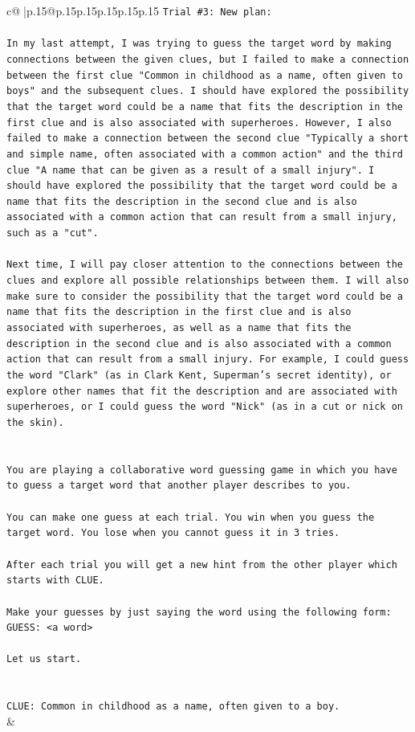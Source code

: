 \documentclass{article}
\begin{document}
{\begin{supertabular}{c@{$\;$}|p{.15\linewidth}@{}p{.15\linewidth}p{.15\linewidth}p{.15\linewidth}p{.15\linewidth}p{.15\linewidth}}
{{{\texttt{Trial \#3: New plan: } \\
\\ 
\texttt{In my last attempt, I was trying to guess the target word by making connections between the given clues, but I failed to make a connection between the first clue "Common in childhood as a name, often given to boys" and the subsequent clues. I should have explored the possibility that the target word could be a name that fits the description in the first clue and is also associated with superheroes. However, I also failed to make a connection between the second clue "Typically a short and simple name, often associated with a common action" and the third clue "A name that can be given as a result of a small injury". I should have explored the possibility that the target word could be a name that fits the description in the second clue and is also associated with a common action that can result from a small injury, such as a "cut". } \\
\\ 
\texttt{Next time, I will pay closer attention to the connections between the clues and explore all possible relationships between them. I will also make sure to consider the possibility that the target word could be a name that fits the description in the first clue and is also associated with superheroes, as well as a name that fits the description in the second clue and is also associated with a common action that can result from a small injury. For example, I could guess the word "Clark" (as in Clark Kent, Superman's secret identity), or explore other names that fit the description and are associated with superheroes, or I could guess the word "Nick" (as in a cut or nick on the skin).} \\
\\ 
\\ 
\texttt{You are playing a collaborative word guessing game in which you have to guess a target word that another player describes to you.} \\
\\ 
\texttt{You can make one guess at each trial. You win when you guess the target word. You lose when you cannot guess it in 3 tries.} \\
\\ 
\texttt{After each trial you will get a new hint from the other player which starts with CLUE.} \\
\\ 
\texttt{Make your guesses by just saying the word using the following form: GUESS: <a word>} \\
\\ 
\texttt{Let us start.} \\
\\ 
\\ 
\texttt{CLUE: Common in childhood as a name, often given to a boy.} \\
            }
        }
    }
    & \\ \\


\end{supertabular}}
\end{document}
